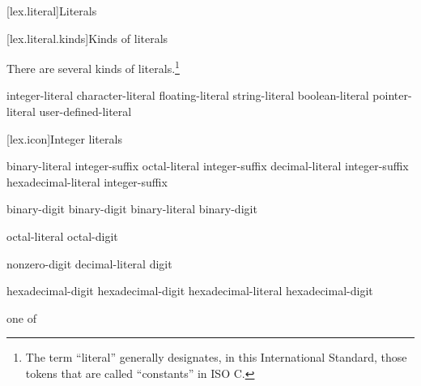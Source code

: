 [lex.literal]{Literals}%

[lex.literal.kinds]{Kinds of literals}

\pnum
{}%
%
There are several kinds of literals.\footnote{The term ``literal'' generally designates, in this
International Standard, those tokens that are called ``constants'' in
ISO C. }

\begin{bnf}
\br
    integer-literal\br
    character-literal\br
    floating-literal\br
    string-literal\br
    boolean-literal\br
    pointer-literal\br
    user-defined-literal
\end{bnf}

[lex.icon]{Integer literals}

%
\begin{bnf}
\br
    binary-literal integer-suffix\opt\br
    octal-literal integer-suffix\opt\br
    decimal-literal integer-suffix\opt\br
    hexadecimal-literal integer-suffix\opt
\end{bnf}

\begin{bnf}
\br
     binary-digit\br
     binary-digit\br
    binary-literal \opt binary-digit
\end{bnf}

\begin{bnf}
\br
    \br
    octal-literal \opt octal-digit
\end{bnf}

\begin{bnf}
\br
    nonzero-digit\br
    decimal-literal \opt digit
\end{bnf}

\begin{bnf}
\br
     hexadecimal-digit\br
     hexadecimal-digit\br
    hexadecimal-literal \opt hexadecimal-digit
\end{bnf}

\begin{bnf}
\br
    \br
\end{bnf}

\begin{bnf}
 \textnormal{one of}\br
\end{bnf}

